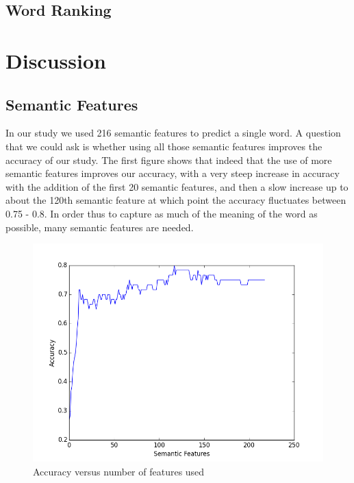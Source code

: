 \documentclass{article} %
\begin{document}
\subsection{Word Ranking}


\section{Discussion}


\subsection{Semantic Features}

In our study we used 216 semantic features to predict a single word. A question that we could ask is whether using all those semantic features improves the accuracy of our study. The first figure shows that indeed that the use of more semantic features improves our accuracy, with a very steep increase in accuracy with the addition of the first 20 semantic features, and then a slow increase up to about the 120th semantic feature at which point the accuracy fluctuates between 0.75  - 0.8. In order thus to capture as much of the meaning of the word as possible, many semantic features are needed.

\begin{figure}[h]
\begin{center}
\includegraphics[scale=0.5]{accuracyVSnumFeatures.png}
\end{center}
\caption{Accuracy versus number of features used}
\end{figure}
\end{document}

